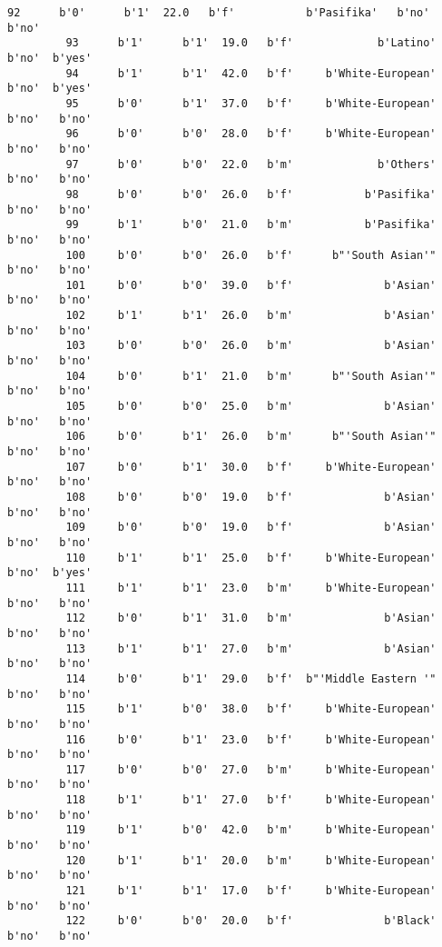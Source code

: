 \documentclass[11pt]{article}
\begin{document}
\begin{Verbatim}[commandchars=\\\{\}]
         92      b'0'      b'1'  22.0   b'f'           b'Pasifika'   b'no'   b'no'   
         93      b'1'      b'1'  19.0   b'f'             b'Latino'   b'no'  b'yes'   
         94      b'1'      b'1'  42.0   b'f'     b'White-European'   b'no'  b'yes'   
         95      b'0'      b'1'  37.0   b'f'     b'White-European'   b'no'   b'no'   
         96      b'0'      b'0'  28.0   b'f'     b'White-European'   b'no'   b'no'   
         97      b'0'      b'0'  22.0   b'm'             b'Others'   b'no'   b'no'   
         98      b'0'      b'0'  26.0   b'f'           b'Pasifika'   b'no'   b'no'   
         99      b'1'      b'0'  21.0   b'm'           b'Pasifika'   b'no'   b'no'   
         100     b'0'      b'0'  26.0   b'f'      b"'South Asian'"   b'no'   b'no'   
         101     b'0'      b'0'  39.0   b'f'              b'Asian'   b'no'   b'no'   
         102     b'1'      b'1'  26.0   b'm'              b'Asian'   b'no'   b'no'   
         103     b'0'      b'0'  26.0   b'm'              b'Asian'   b'no'   b'no'   
         104     b'0'      b'1'  21.0   b'm'      b"'South Asian'"   b'no'   b'no'   
         105     b'0'      b'0'  25.0   b'm'              b'Asian'   b'no'   b'no'   
         106     b'0'      b'1'  26.0   b'm'      b"'South Asian'"   b'no'   b'no'   
         107     b'0'      b'1'  30.0   b'f'     b'White-European'   b'no'   b'no'   
         108     b'0'      b'0'  19.0   b'f'              b'Asian'   b'no'   b'no'   
         109     b'0'      b'0'  19.0   b'f'              b'Asian'   b'no'   b'no'   
         110     b'1'      b'1'  25.0   b'f'     b'White-European'   b'no'  b'yes'   
         111     b'1'      b'1'  23.0   b'm'     b'White-European'   b'no'   b'no'   
         112     b'0'      b'1'  31.0   b'm'              b'Asian'   b'no'   b'no'   
         113     b'1'      b'1'  27.0   b'm'              b'Asian'   b'no'   b'no'   
         114     b'0'      b'1'  29.0   b'f'  b"'Middle Eastern '"   b'no'   b'no'   
         115     b'1'      b'0'  38.0   b'f'     b'White-European'   b'no'   b'no'   
         116     b'0'      b'1'  23.0   b'f'     b'White-European'   b'no'   b'no'   
         117     b'0'      b'0'  27.0   b'm'     b'White-European'   b'no'   b'no'   
         118     b'1'      b'1'  27.0   b'f'     b'White-European'   b'no'   b'no'   
         119     b'1'      b'0'  42.0   b'm'     b'White-European'   b'no'   b'no'   
         120     b'1'      b'1'  20.0   b'm'     b'White-European'   b'no'   b'no'   
         121     b'1'      b'1'  17.0   b'f'     b'White-European'   b'no'   b'no'   
         122     b'0'      b'0'  20.0   b'f'              b'Black'   b'no'   b'no'   

\end{Verbatim}
\end{document}
